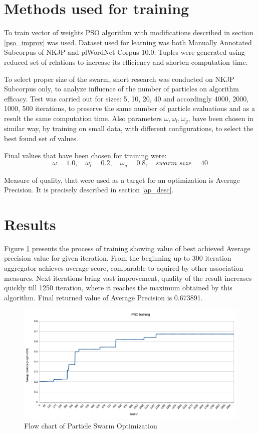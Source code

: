 \section{Methods used for training}
To train vector of weights PSO algorithm with modifications described in section \ref{pso_improv} was used. 
Dataset used for learning was both Manually Annotated Subcorpus of NKJP and plWordNet Corpus 10.0. Tuples were generated using reduced set of relations
to increase its efficiency and shorten computation time.

To select proper size of the swarm, short research was conducted on NKJP Subcorpus only, to analyze influence of the number of particles on 
algorithm efficacy. Test was carried out for sizes: 5, 10, 20, 40 and accordingly 4000, 2000, 1000, 500 iterations, 
to preserve the same number of particle evaluations and as a result the same computation time.
Also parameters \(\omega, \omega _l, \omega _g\), bave been chosen in similar way, by training on small data, with different configurations, 
to select the best found set of values.

Final values that have been chosen for training were: \\
\[
\omega = 1.0, \quad
\omega _l = 0.2, \quad
\omega _g = 0.8, \quad
swarm\_size = 40
\]

Measure of quality, that were used as a target for an optimization is Average Precision. It is precisely described in section \ref{ap_desc}.

\section{Results}
Figure \ref{pso_train} presents the process of training showing value of best achieved Average precision value for given iteration.
From the beginning up to 300 iteration aggregator achieves average score, comparable to aquired by other association measures. 
Next iterations bring vast improvement, quality of the result increases quickly till 1250 iteration, where it reaches the maximum 
obtained by this algorithm. Final returned value of Average Precision is 0.673891.


\begin{figure}[ht]
    \centering
    \includegraphics[scale=0.45]{img/pso_train.png}
    \caption{Flow chart of Particle Swarm Optimization}
    \label{pso_train}
\end{figure}
